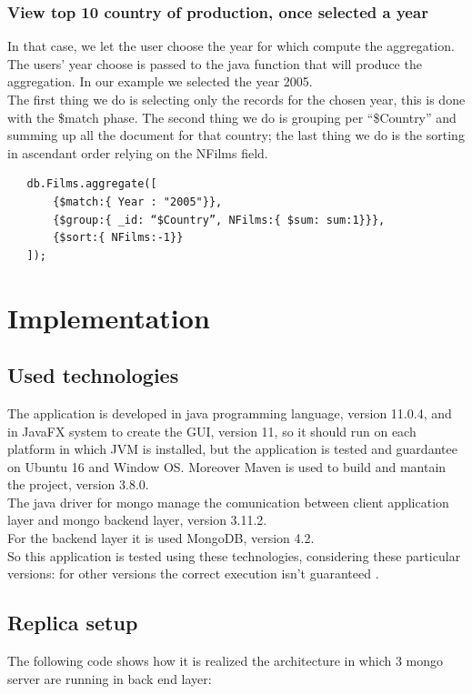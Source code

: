 \documentclass[a4paper, oneside]{article}
\begin{document}
\subsubsection{View top 10 country of production, once selected a year}
In that case, we let the user choose the year for which compute the aggregation. The users’ year choose is passed to the java function that will produce the aggregation. In our example we selected the year 2005.\\
The first thing we do is selecting only the records for the chosen year, this is done with the \$match phase. The second thing we do is grouping per “\$Country” and summing up all the document for that country; the last thing we do is the sorting in ascendant order relying on the NFilms field.
\begin{verbatim}
   db.Films.aggregate([
       {$match:{ Year : "2005"}},
       {$group:{ _id: “$Country”, NFilms:{ $sum: sum:1}}},
       {$sort:{ NFilms:-1}}
   ]);
\end{verbatim}

\clearpage

\section{Implementation}
\subsection{Used technologies}
The application is developed in java programming language, version 11.0.4, and in JavaFX system to create the GUI, version 11, so it should run on each platform in which JVM is installed, but the application is tested and guardantee on Ubuntu 16 and Window OS. Moreover Maven is used  to build and mantain the project, version 3.8.0. \\
The java driver for mongo manage the comunication between client application layer and mongo backend layer, version 3.11.2.\\ 
For the backend layer it is used MongoDB, version 4.2.\\
So this application is tested using these technologies, considering these particular versions: for other versions the correct execution isn't guaranteed .\\

\subsection{Replica setup}
The following code shows how it is realized the architecture in which 3 mongo server are running in back end layer:
\vspace{2mm}

\vspace{5mm}
\end{document}
